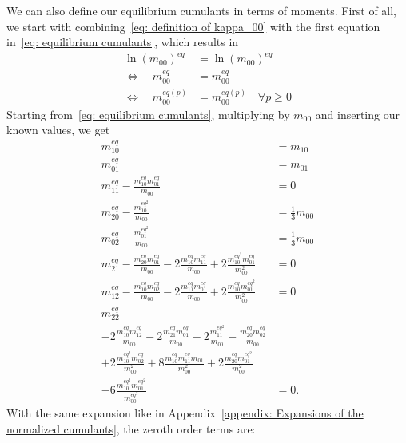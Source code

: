 We can also define our equilibrium cumulants in terms of moments.
First of all, we start with combining~\eqref{eq: definition of kappa_00} with the first equation in~\eqref{eq: equilibrium cumulants}, which results in
\begin{equation}
  \begin{aligned}
    {\ln(m_{00})}^{eq} &= {\ln(m_{00})}^{eq} \\
    \Leftrightarrow\quad m_{00}^{eq} &= m_{00}^{eq} \\
    \Leftrightarrow\quad m_{00}^{eq(p)} &= m_{00}^{eq(p)} \quad\forall p\ge 0
  \end{aligned}
\end{equation}
Starting from~\eqref{eq: equilibrium cumulants}, multiplying by $m_{00}$ and inserting our known values, we get
\begin{equation}
  \begin{aligned}
    m_{10}^{eq} & = m_{10} \\
    m_{01}^{eq} & = m_{01} \\
    m_{11}^{eq} - \frac{m_{10}^{eq}m_{01}^{eq}}{m_{00}} & = 0 \\
    m_{20}^{eq} - \frac{m_{10}^{{eq}^2}}{m_{00}} & = \frac{1}{3} m_{00} \\
    m_{02}^{eq} - \frac{m_{01}^{{eq}^2}}{m_{00}} & = \frac{1}{3} m_{00} \\
    m_{21}^{eq} - \frac{m_{20}^{eq}m_{01}^{eq}}{m_{00}} - 2\frac{m_{10}^{eq}m_{11}^{eq}} {m_{00}} + 2\frac{m_{10}^{{eq}^2} m_{01}^{eq}}{m_{00}^2} & = 0 \\
    m_{12}^{eq} - \frac{m_{10}^{eq}m_{02}^{eq}}{m_{00}}
    - 2\frac{m_{11}^{eq}m_{01}^{eq}}{m_{00}} + 2\frac{m_{10}^{eq} m_{01}^{{eq}^2}}{m_{00}^2} & = 0 \\
    m_{22}^{eq} &\\
    - 2 \frac{m_{10}^{eq}m_{12}^{eq}}{m_{00}} - 2\frac{m_{21}^{eq}m_{01}^{eq}}{m_{00}}
    - 2 \frac{m_{11}^{{eq}^2}}{m_{00}} - \frac{m_{20}^{eq}m_{02}^{eq}}{m_{00}} &\\
    + 2 \frac{m_{10}^{{eq}^2} m_{02}^{eq}}{m_{00}^2} + 8 \frac{m_{10}^{eq}m_{11}^{eq}m_{01}} {m_{00}^2}
    + 2 \frac{m_{20}^{eq}m_{01}^{{eq}^2}}{m_{00}^2} &\\
    - 6 \frac{m_{10}^{{eq}^2} m_{01}^{{eq}^2}}{m_{00}^{{eq}^3}} & = 0.
  \end{aligned}
\end{equation}
With the same expansion like in Appendix~\ref{appendix: Expansions of the normalized cumulants}, the zeroth order terms are:
